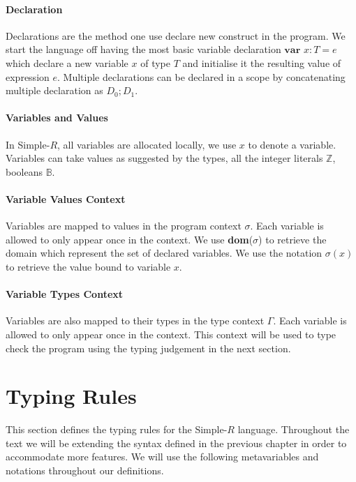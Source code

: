 \documentclass[a4paper,12pt]{report}
\begin{document}
\paragraph{Declaration} Declarations are the method one use declare new construct 
in the program. We start the language off having the most basic variable declaration 
$\textbf{var }x : T = e$ which declare a new variable $x$ of type $T$ and 
initialise it the resulting value of expression $e$. Multiple declarations can 
be declared in a scope by concatenating multiple declaration as $D_0;D_1$.

\paragraph{Variables and Values} In Simple-$R$, all variables are allocated 
locally, we use $x$ to denote a variable. Variables can take values as suggested by the types, all the integer 
literals $\mathbb{Z}$, booleans $\mathbb{B}$.

\paragraph{Variable Values Context} Variables are mapped to values in the program 
context $\sigma$. Each variable is allowed to only appear once in 
the context. We use \textbf{dom}($\sigma$) to retrieve the domain which represent 
the set of declared variables. We use the notation $\sigma(x)$ 
to retrieve the value bound to variable $x$.

\paragraph{Variable Types Context} Variables are also mapped to their types 
in the type context $\Gamma$. Each variable is allowed to only appear once in 
the context. This context will be used to type check the program using the 
typing judgement in the next section.

\section{Typing Rules}
This section defines the typing rules for the Simple-$R$ language. 
Throughout the text we will be extending the syntax defined in the 
previous chapter in order to accommodate more features. 
We will use the following metavariables and notations throughout our 
definitions.
\end{document}
